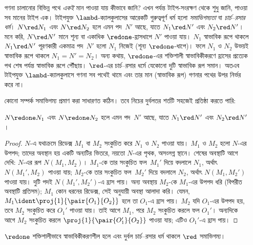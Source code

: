 \documentclass[../../../include/open-logic-section]{subfiles}
\begin{document}
গণনা চালানোর বিভিন্ন পথে \emph{একই}
মান পাওয়া যায় কীভাবে জানি? এখন পর্যন্ত
টাইপ-সংরক্ষণ থেকে শুধু জানি, পাওয়া সব
মানের টাইপ এক। টাইপযুক্ত $\lambd$-ক্যালকুলাসের
আরেকটি গুরুত্বপূর্ণ ধর্ম হলো \emph{সমাভিগম্যতা}
বা \emph{চার্চ--রসার ধর্ম}। $N \red N_1$
এবং $N \red N_2$ হলে এমন পদ~$N'$ আছে,
যাতে $N_1 \red N'$ এবং $N_2 \red N'$।
মনে করি, $N \red N'$ মানে শূন্য বা একাধিক
$\redone$-হ্রাসধাপে $N'$ পাওয়া যায়।
$N_1$ স্বাভাবিক রূপে থাকলে $N_1 \red N'$
পূরণকারী একমাত্র পদ~$N'$ হলো $N_1$ নিজেই
(শূন্য $\redone$-ধাপে)। ফলে $N_1$ ও
$N_2$ উভয়ই স্বাভাবিক রূপে থাকলে
$N_1 = N' = N_2$। অন্য কথায়,
$\redone$-এর শক্তিশালী স্বাভাবিকীকরণে
হ্রাসের প্রত্যেক পথ শেষ পর্যন্ত স্বাভাবিক রূপে
পৌঁছায়। $\red$-এর চার্চ--রসার ধর্মে
যেকোনো দুটি স্বাভাবিক রূপ সমান। অতএব
টাইপযুক্ত $\lambd$-ক্যালকুলাসে গণনা সব
পথেই থামে এবং তার মান (স্বাভাবিক রূপ)
গণনার পথের উপর নির্ভর করে না।

কোনো সম্পর্ক সমাভিগম্য প্রমাণ করা সাধারণত
কঠিন। তবে নিচের দুর্বলতর শর্তটি সহজেই
প্রতিষ্ঠা করতে পারি:

\begin{prop}[দুর্বল চার্চ--রসার ধর্ম]
$N \redone N_1$ এবং $N \redone N_2$
হলে এমন পদ~$N'$ আছে, যাতে $N_1 \red N'$
এবং $N_2 \red N'$।
\end{prop}

\begin{proof}
  $N$-এ যথাক্রমে রিডেক্স $M_1$ বা $M_2$
  সংকুচিত করে $N_1$ ও $N_2$ পাওয়া যায়।
  $M_1$ ও $M_2$ হলো $N$-এর উপপদ; তাদের
  অবস্থান হয় একটি অন্যটির ভিতরে, নয়তো
  $N$-এর পৃথক, অসংলগ্ন স্থানে। শেষের অবস্থাটি
  আগে দেখি: $N$-এর রূপ $N(M_1,M_2)$।
  $M_1$-কে তার সংকুচিত ফল~$M_1'$ দিয়ে
  বদলালে $N_1$, অর্থাৎ $N(M_1',M_2)$
  পাওয়া যায়; $M_2$-কে তার সংকুচিত ফল~$M_2'$
  দিয়ে বদলালে $N_2$, অর্থাৎ
  $N(M_1,M_2')$ পাওয়া যায়। দুটি পদই
  $N(M_1',M_2')$-এ হ্রাস পায়। অন্য
  অবস্থায় $M_2$-কে $M_1$-এর উপপদ ধরি
  (বিপরীত অবস্থাটি প্রতিসম); $M_1$ কোন
  ধরনের রিডেক্স, সেই অনুযায়ী
  অবস্থা আলাদা করি। যেমন,
  $M_1 \ident \proj{1}{\pair{O_1}{O_2}}$
  হলে তা $O_1$-এ হ্রাস পায়। $M_2$
  যদি $O_1$-এর উপপদ হয়, তবে $M_2$
  সংকুচিত করে $O_1'$ পাওয়া যায়। তাই
  আগে $M_1$, পরে $M_2$ সংকুচিত করলে
  ফল $O_1'$। অন্যদিকে আগে $M_2$
  সংকুচিত করলে
  $\proj{1}{\pair{O_1'}{O_2}}$
  পাওয়া যায়; এটিও $O_1'$-এ হ্রাস পায়।
\end{proof}

\begin{lem}[নিউম্যানের সহায়ক উপপাদ্য]
$\redone$ শক্তিশালীভাবে স্বাভাবিকীকরণশীল হলে
এবং দুর্বল চার্চ--রসার ধর্ম থাকলে $\red$
সমাভিগম্য।
\end{lem}
\end{document}
